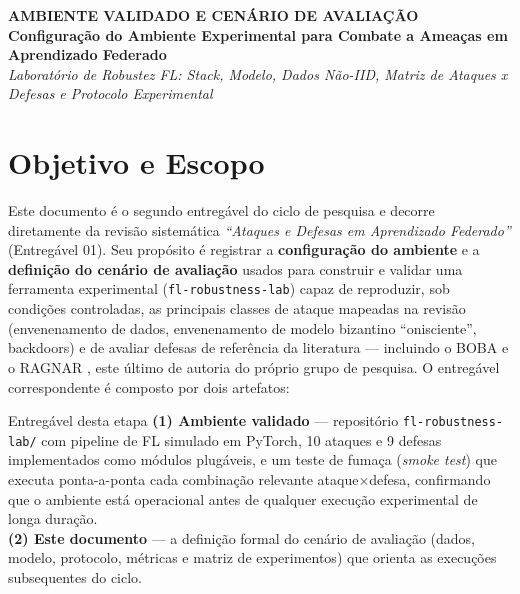 \documentclass[11pt,a4paper]{article}
\begin{document}
\begin{center}
    \vspace*{10pt}
    {\color{primary}\fontsize{20}{24}\selectfont\textbf{AMBIENTE VALIDADO E CENÁRIO DE AVALIAÇÃO}} \\[8pt]
    {\color{secondary}\fontsize{13}{16}\selectfont\textbf{Configuração do Ambiente Experimental para Combate a Ameaças em Aprendizado Federado}} \\[12pt]
    {\color{gray}\fontsize{9}{11}\selectfont\textit{Laboratório de Robustez FL: Stack, Modelo, Dados Não-IID, Matriz de Ataques x Defesas e Protocolo Experimental}} \\[8pt]
    \noindent\makebox[\linewidth]{\color{secondary!50}\rule{\textwidth}{1.2pt}}
    \vspace*{10pt}
\end{center}

\section*{Objetivo e Escopo}
Este documento é o segundo entregável do ciclo de pesquisa e decorre diretamente da revisão sistemática
\textit{``Ataques e Defesas em Aprendizado Federado''} (Entregável 01). Seu propósito é registrar a
\textbf{configuração do ambiente} e a \textbf{definição do cenário de avaliação} usados para construir e
validar uma ferramenta experimental (\texttt{fl-robustness-lab}) capaz de reproduzir, sob condições
controladas, as principais classes de ataque mapeadas na revisão (envenenamento de dados, envenenamento de
modelo bizantino ``onisciente'', backdoors) e de avaliar defesas de referência da literatura — incluindo o
BOBA \cite{boba} e o RAGNAR \cite{ragnar}, este último de autoria do próprio grupo de pesquisa. O entregável
correspondente é composto por dois artefatos:

\begin{calloutbox}{Entregável desta etapa}
\textbf{(1) Ambiente validado} — repositório \texttt{fl-robustness-lab/} com pipeline de FL simulado em
PyTorch, 10 ataques e 9 defesas implementados como módulos plugáveis, e um teste de fumaça (\textit{smoke
test}) que executa ponta-a-ponta cada combinação relevante ataque$\times$defesa, confirmando que o ambiente
está operacional antes de qualquer execução experimental de longa duração.\\[4pt]
\textbf{(2) Este documento} — a definição formal do cenário de avaliação (dados, modelo, protocolo,
métricas e matriz de experimentos) que orienta as execuções subsequentes do ciclo.
\end{calloutbox}
\end{document}

